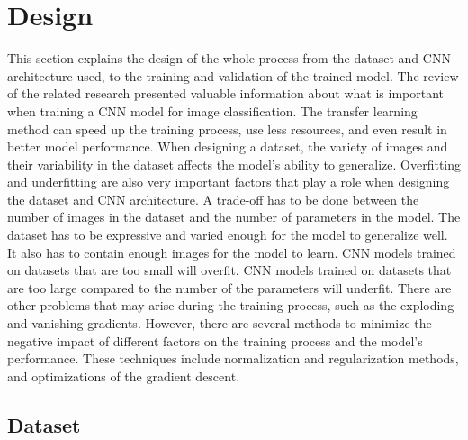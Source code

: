 \documentclass{BachelorBUI}
\begin{document}
\section{Design}

    This section explains the design of the whole process from the dataset and CNN architecture used, to the training and validation of the trained model. The review of the related research presented valuable information about what is important when training a CNN model for image classification. The transfer learning method can speed up the training process, use less resources, and even result in better model performance. When designing a dataset, the variety of images and their variability in the dataset affects the model's ability to generalize. Overfitting and underfitting are also very important factors that play a role when designing the dataset and CNN architecture. A trade-off has to be done between the number of images in the dataset and the number of parameters in the model. The dataset has to be expressive and varied enough for the model to generalize well. It also has to contain enough images for the model to learn. CNN models trained on datasets that are too small will overfit. CNN models trained on datasets that are too large compared to the number of the parameters will underfit. There are other problems that may arise during the training process, such as the exploding and vanishing gradients. However, there are several methods to minimize the negative impact of different factors on the training process and the model's performance. These techniques include normalization and regularization methods, and optimizations of the gradient descent.

    \subsection{Dataset}
    \label{subsub:dataset}
\end{document}

